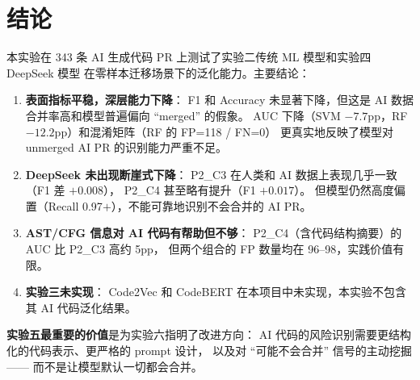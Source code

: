 \documentclass{experimentreport}
\begin{document}
\section{结论}

本实验在 343 条 AI 生成代码 PR 上测试了实验二传统 ML 模型和实验四 DeepSeek 模型
在零样本迁移场景下的泛化能力。主要结论：

\begin{enumerate}
    \item \textbf{表面指标平稳，深层能力下降}：
          F1 和 Accuracy 未显著下降，但这是 AI 数据合并率高和模型普遍偏向 ``merged'' 的假象。
          AUC 下降（SVM $-7.7$pp，RF $-12.2$pp）和混淆矩阵（RF 的 FP=118 / FN=0）
          更真实地反映了模型对 unmerged AI PR 的识别能力严重不足。

    \item \textbf{DeepSeek 未出现断崖式下降}：
          P2\_C3 在人类和 AI 数据上表现几乎一致（F1 差 $+0.008$），
          P2\_C4 甚至略有提升（F1 $+0.017$）。
          但模型仍然高度偏置（Recall 0.97$+$），不能可靠地识别不会合并的 AI PR。

    \item \textbf{AST/CFG 信息对 AI 代码有帮助但不够}：
          P2\_C4（含代码结构摘要）的 AUC 比 P2\_C3 高约 5pp，
          但两个组合的 FP 数量均在 96--98，实践价值有限。

    \item \textbf{实验三未实现}：
          Code2Vec 和 CodeBERT 在本项目中未实现，本实验不包含其 AI 代码泛化结果。
\end{enumerate}

\textbf{实验五最重要的价值}是为实验六指明了改进方向：
AI 代码的风险识别需要更结构化的代码表示、更严格的 prompt 设计，
以及对 ``可能不会合并'' 信号的主动挖掘 —— 而不是让模型默认一切都会合并。
\end{document}
